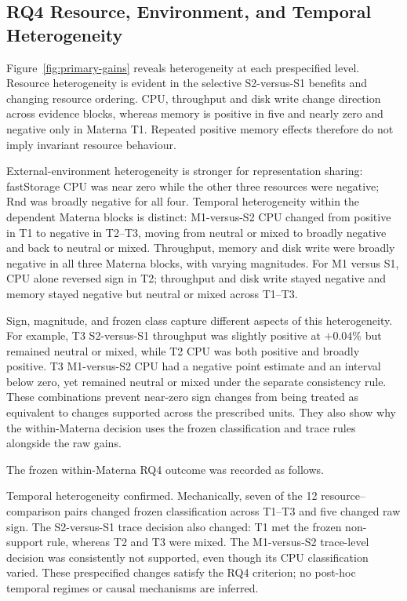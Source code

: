 \documentclass[a4paper,fleqn]{cas-dc}
\begin{document}
\subsection{RQ4 Resource, Environment, and Temporal Heterogeneity}
\label{sec:results-rq4}

Figure~\ref{fig:primary-gains} reveals heterogeneity at each prespecified
level. Resource heterogeneity is evident in the selective S2-versus-S1
benefits and changing resource ordering. CPU, throughput and disk write change
direction across evidence blocks, whereas memory is positive in five and
nearly zero and negative only in Materna T1. Repeated positive memory effects
therefore do not imply invariant resource behaviour.

External-environment heterogeneity is stronger for representation sharing: fastStorage
CPU was near zero while the other three resources were negative; Rnd was
broadly negative for all four. Temporal heterogeneity within the dependent
Materna blocks is distinct: M1-versus-S2 CPU changed from positive in T1 to
negative in T2--T3, moving from neutral or mixed to broadly negative and back
to neutral or mixed. Throughput, memory and disk write were broadly negative
in all three Materna blocks, with varying magnitudes. For M1 versus S1, CPU
alone reversed sign in T2; throughput and disk write stayed negative and
memory stayed negative but neutral or mixed across T1--T3.

Sign, magnitude, and frozen class capture different aspects of this
heterogeneity. For example, T3 S2-versus-S1 throughput was slightly positive at
$+0.04\%$ but remained neutral or mixed, while T2 CPU was both positive and
broadly positive. T3 M1-versus-S2 CPU had a negative point estimate and an
interval below zero, yet remained neutral or mixed under the separate
consistency rule. These combinations prevent near-zero sign changes from being
treated as equivalent to changes supported across the prescribed units. They
also show why the within-Materna decision uses the frozen classification and
trace rules alongside the raw gains.

The frozen within-Materna RQ4 outcome was recorded as follows.

\noindent Temporal heterogeneity confirmed. Mechanically, seven of the 12
resource--comparison pairs changed frozen classification across T1--T3 and
five changed raw sign. The S2-versus-S1 trace decision also changed: T1 met the
frozen non-support rule, whereas T2 and T3 were mixed. The M1-versus-S2
trace-level decision was consistently not supported, even though its CPU
classification varied. These prespecified changes satisfy the RQ4 criterion;
no post-hoc temporal regimes or causal mechanisms are inferred.
\end{document}
